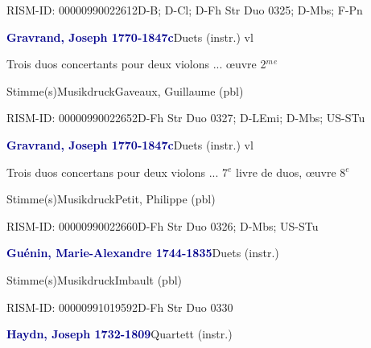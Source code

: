 \documentclass[twocolumn, 12pt]{book}
\begin{document}
\par RISM-ID: 00000990022612\newline D-B; D-Cl; D-Fh  Str Duo 0325; D-Mbs; F-Pn
\par \vspace{16pt} \textcolor{darkblue}{\textbf{Gravrand, Joseph  1770-1847c}}\hfillplus{\textbf{[280]}}\newline Duets (instr.) vl
\par \begin{itshape}Trois duos concertants pour deux violons ... œuvre 2$^m$$^e$\end{itshape} 
\par \textcolor{darkblue}{}  Stimme(s)\newline Musikdruck\newline Gaveaux, Guillaume  (pbl)
\par RISM-ID: 00000990022652\newline D-Fh  Str Duo 0327; D-LEmi; D-Mbs; US-STu
\par \vspace{16pt} \textcolor{darkblue}{\textbf{Gravrand, Joseph  1770-1847c}}\hfillplus{\textbf{[281]}}\newline Duets (instr.) vl
\par \begin{itshape}Trois duos concertans pour deux violons ... 7$^e$ livre de duos, œuvre 8$^e$\end{itshape} 
\par \textcolor{darkblue}{}  Stimme(s)\newline Musikdruck\newline Petit, Philippe  (pbl)
\par RISM-ID: 00000990022660\newline D-Fh  Str Duo 0326; D-Mbs; US-STu
\par \vspace{16pt} \textcolor{darkblue}{\textbf{Guénin, Marie-Alexandre  1744-1835}}\hfillplus{\textbf{[282]}}\newline Duets (instr.)
\par \textcolor{darkblue}{}  Stimme(s)\newline Musikdruck\newline Imbault  (pbl)
\par RISM-ID: 00000991019592\newline D-Fh  Str Duo 0330
\par \vspace{16pt} \textcolor{darkblue}{\textbf{Haydn, Joseph  1732-1809}}\hfillplus{\textbf{[283]}}\newline Quartett (instr.)
\end{document}
